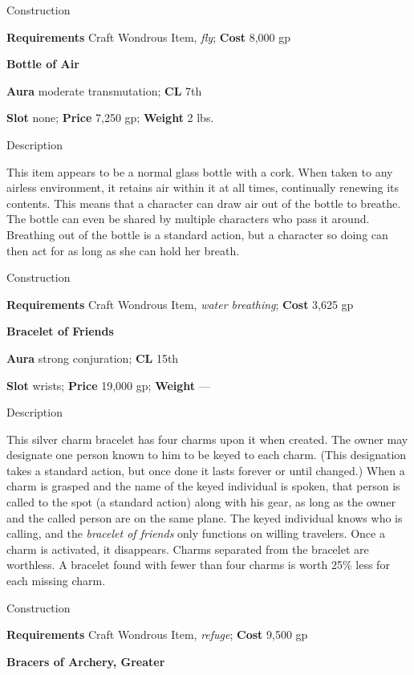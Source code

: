 Construction
				
\textbf{Requirements} Craft Wondrous Item, \textit{fly}; \textbf{Cost }8,000 gp
				
\textbf{Bottle of Air}
				
\textbf{Aura} moderate transmutation;\textbf{ CL }7th
				
\textbf{Slot} none; \textbf{Price} 7,250 gp; \textbf{Weight} 2 lbs.
				
Description
				
This item appears to be a normal glass bottle with a cork. When taken to any airless environment, it retains air within it at all times, continually renewing its contents. This means that a character can draw air out of the bottle to breathe. The bottle can even be shared by multiple characters who pass it around. Breathing out of the bottle is a standard action, but a character so doing can then act for as long as she can hold her breath. 
				
Construction
				
\textbf{Requirements} Craft Wondrous Item, \textit{water breathing}; \textbf{Cost }3,625 gp
				
\textbf{Bracelet of Friends}
				
\textbf{Aura} strong conjuration;\textbf{ CL }15th
				
\textbf{Slot} wrists; \textbf{Price} 19,000 gp; \textbf{Weight }---
				
Description
				
This silver charm bracelet has four charms upon it when created. The owner may designate one person known to him to be keyed to each charm. (This designation takes a standard action, but once done it lasts forever or until changed.) When a charm is grasped and the name of the keyed individual is spoken, that person is called to the spot (a standard action) along with his gear, as long as the owner and the called person are on the same plane. The keyed individual knows who is calling, and the \textit{bracelet of friends }only functions on willing travelers. Once a charm is activated, it disappears. Charms separated from the bracelet are worthless. A bracelet found with fewer than four charms is worth 25\% less for each missing charm. 
				
Construction
				
\textbf{Requirements} Craft Wondrous Item, \textit{refuge}; \textbf{Cost }9,500 gp
				
\textbf{Bracers of Archery, Greater}
				
